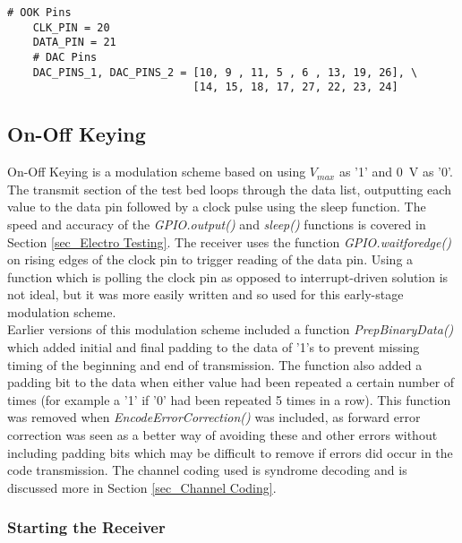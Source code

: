 \documentclass[../main.tex]{subfiles}
\begin{document}
\begin{lstlisting}[caption={Pins used for OOK and the DACs}, label={lst_Pins}]
	# OOK Pins
	CLK_PIN = 20
	DATA_PIN = 21
	# DAC Pins
	DAC_PINS_1, DAC_PINS_2 = [10, 9 , 11, 5 , 6 , 13, 19, 26], \
							 [14, 15, 18, 17, 27, 22, 23, 24]
\end{lstlisting} 

\subsection{On-Off Keying} \label{sec_On-Off Keying}

On-Off Keying is a modulation scheme based on using $V_{max}$ as '1' and \SI{0}{\volt} as '0'.
The transmit section of the test bed loops through the data list, outputting each value to the data pin followed by a clock pulse using the sleep function.
The speed and accuracy of the \textit{GPIO.output()} and \textit{sleep()} functions is covered in Section \ref{sec_Electro Testing}.
The receiver uses the function \textit{GPIO.wait\textunderscore for\textunderscore edge()} on rising edges of the clock pin to trigger reading of the data pin.
Using a function which is polling the clock pin as opposed to interrupt-driven solution is not ideal, but it was more easily written and so used for this early-stage modulation scheme.\\

Earlier versions of this modulation scheme included a function \textit{Prep\textunderscore Binary\textunderscore Data()} which added initial and final padding to the data of '1's to prevent missing timing of the beginning and end of transmission.
The function also added a padding bit to the data when either value had been repeated a certain number of times (for example a '1' if '0' had been repeated 5 times in a row).
This function was removed when \textit{Encode\textunderscore Error\textunderscore Correction()} was included, as forward error correction was seen as a better way of avoiding these and other errors without including padding bits which may be difficult to remove if errors did occur in the code transmission.
The channel coding used is syndrome decoding and is discussed more in Section \ref{sec_Channel Coding}.\\


\subsubsection{Starting the Receiver} \label{sec_SSH}
\end{document}

